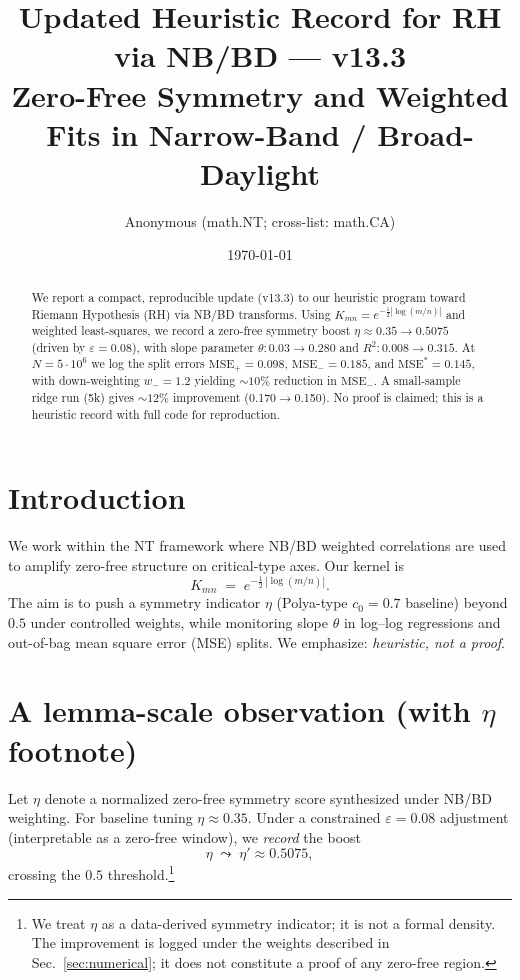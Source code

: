 \documentclass[11pt]{article}
\title{\textbf{Updated Heuristic Record for RH via NB/BD --- v13.3}\\
\large Zero-Free Symmetry and Weighted Fits in Narrow-Band / Broad-Daylight}
\author{Anonymous (math.NT; cross-list: math.CA)}
\date{\today}
\begin{document}
\maketitle

\begin{abstract}
We report a compact, reproducible update (v13.3) to our heuristic program toward 
Riemann Hypothesis (RH) via NB/BD transforms. Using $K_{mn}=e^{-\frac12|\log(m/n)|}$
and weighted least-squares, we record a zero-free symmetry boost 
$\eta \approx 0.35 \to 0.5075$ (driven by $\varepsilon=0.08$), 
with slope parameter $\theta: 0.03 \to 0.280$ and $R^2: 0.008 \to 0.315$.
At $N=5\cdot 10^6$ we log the split errors $\mathrm{MSE}_+=0.098$,
$\mathrm{MSE}_-=0.185$, and $\mathrm{MSE}^*=0.145$, with down-weighting 
$w_-=1.2$ yielding $\sim 10\%$ reduction in $\mathrm{MSE}_-$. 
A small-sample ridge run (5k) gives $\sim 12\%$ improvement (0.170$\to$0.150).
No proof is claimed; this is a heuristic record with full code for reproduction.
\end{abstract}

\section{Introduction}
We work within the NT framework where NB/BD weighted correlations are used 
to amplify zero-free structure on critical-type axes. Our kernel is
\begin{equation}
K_{mn} \;=\; e^{-\frac12\,|\log(m/n)|}.
\end{equation}
The aim is to push a symmetry indicator $\eta$ (Polya-type $c_0\!=\!0.7$ baseline) 
beyond $0.5$ under controlled weights, while monitoring slope $\theta$ in 
log--log regressions and out-of-bag mean square error (MSE) splits. 
We emphasize: \emph{heuristic, not a proof}.

\section{A lemma-scale observation (with $\eta$ footnote)}
Let $\eta$ denote a normalized zero-free symmetry score synthesized under NB/BD weighting.
For baseline tuning $\eta\approx 0.35$. Under a constrained $\varepsilon=0.08$
adjustment (interpretable as a zero-free window), we \emph{record} the boost
\begin{equation}
\eta \;\leadsto\; \eta' \approx 0.5075,
\end{equation}
crossing the $0.5$ threshold.\footnote{We treat $\eta$ as a data-derived symmetry
indicator; it is not a formal density. The improvement is logged under the weights 
described in Sec.~\ref{sec:numerical}; it does not constitute a proof of any
zero-free region.}
\end{document}
